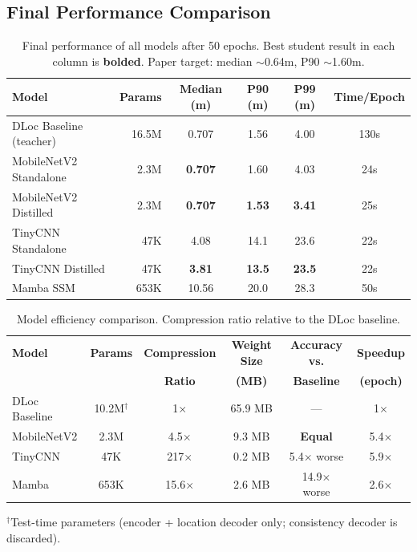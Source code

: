 \documentclass[11pt,a4paper]{article}
\begin{document}
\subsection{Final Performance Comparison}

\begin{table}[H]
\centering
\caption{Final performance of all models after 50 epochs. Best student result in each column is \textbf{bolded}. Paper target: median $\sim$0.64m, P90 $\sim$1.60m.}
\label{tab:results}
\begin{tabular}{lrcccc}
\toprule
\textbf{Model} & \textbf{Params} & \textbf{Median (m)} & \textbf{P90 (m)} & \textbf{P99 (m)} & \textbf{Time/Epoch} \\
\midrule
DLoc Baseline (teacher) & 16.5M & 0.707 & 1.56 & 4.00 & 130s \\
\midrule
MobileNetV2 Standalone & 2.3M & \textbf{0.707} & 1.60 & 4.03 & 24s \\
MobileNetV2 Distilled & 2.3M & \textbf{0.707} & \textbf{1.53} & \textbf{3.41} & 25s \\
TinyCNN Standalone & 47K & 4.08 & 14.1 & 23.6 & 22s \\
TinyCNN Distilled & 47K & \textbf{3.81} & \textbf{13.5} & \textbf{23.5} & 22s \\
Mamba SSM & 653K & 10.56 & 20.0 & 28.3 & 50s \\
\bottomrule
\end{tabular}
\end{table}

\begin{table}[H]
\centering
\caption{Model efficiency comparison. Compression ratio relative to the DLoc baseline.}
\label{tab:efficiency}
\begin{tabular}{lccccc}
\toprule
\textbf{Model} & \textbf{Params} & \textbf{Compression} & \textbf{Weight Size} & \textbf{Accuracy vs.} & \textbf{Speedup} \\
 & & \textbf{Ratio} & \textbf{(MB)} & \textbf{Baseline} & \textbf{(epoch)} \\
\midrule
DLoc Baseline & 10.2M$^\dagger$ & 1$\times$ & 65.9 MB & --- & 1$\times$ \\
MobileNetV2 & 2.3M & 4.5$\times$ & 9.3 MB & \textbf{Equal} & 5.4$\times$ \\
TinyCNN & 47K & 217$\times$ & 0.2 MB & 5.4$\times$ worse & 5.9$\times$ \\
Mamba & 653K & 15.6$\times$ & 2.6 MB & 14.9$\times$ worse & 2.6$\times$ \\
\bottomrule
\end{tabular}
\begin{flushleft}
\small $^\dagger$Test-time parameters (encoder + location decoder only; consistency decoder is discarded).
\end{flushleft}
\end{table}
\end{document}
